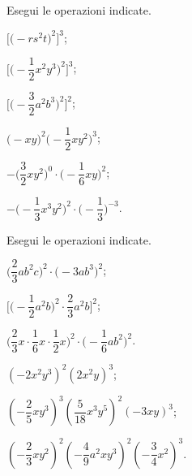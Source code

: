 \begin{esercizio}[\Ast]
 \label{ese:10.18} %
 Esegui le operazioni indicate.
\begin{multicols}{2}
\begin{enumeratea}
\spazielenx
 \item $\bigg[\big(-rs^{2}t\big)^{2}\bigg]^{3}$;
 \item $\Bigg[\bigg(-{\dfrac{1}{2}}x^{2}y^{3}\bigg)^{2}\Bigg]^{3}$;
 \item $\Bigg[\bigg(-{\dfrac{3}{2}}a^{2}b^{3}\bigg)^{2}\Bigg]^{2}$;
 \item $\big(-xy\big)^{2}\bigg(-{\dfrac{1}{2}}xy^{2}\bigg)^{3}$;
 \item $-\bigg(\dfrac{3}{2}xy^{2}\bigg)^{0}\cdot\bigg(-{\dfrac{1}{6}}xy\bigg)^{2}$;
 \item $-\bigg(-{\dfrac{1}{3}}x^{3}y^{2}\bigg)^{2}\cdot\bigg(-{\dfrac{1}{3}}\bigg)^{-3}$.
\end{enumeratea}
\end{multicols}
\end{esercizio}
\pagebreak
\begin{esercizio}[\Ast]
 \label{ese:10.19} %
 Esegui le operazioni indicate.
\begin{multicols}{2}
\begin{enumeratea}
\spazielenx
 \item $\bigg(\dfrac{2}{3}ab^{2}c\bigg)^{2}\cdot\big(-3ab^{3}\big)^{2}$;
 \item $\Bigg[\bigg(-{\dfrac{1}{2}}a^{2}b\bigg)^{2}\cdot{\dfrac{2}{3}a^{2}b}\Bigg]^{2}$;
 \item $\bigg(\dfrac{2}{3}x\cdot{\dfrac{1}{6}}x\cdot {\dfrac{1}{2}}x\bigg)^{2}\cdot\bigg(-{\dfrac{1}{6}}ab^{2}\bigg)^{2}$.
 \item $\left(-2x^2y^3\right)^2\left(2x^2y\right)^3$;
 \item $\left(-\dfrac{2}{5}xy^3\right)^3\left(\dfrac{5}{18}x^3y^5\right)^2\left(-3xy\right)^3$;
 \item $\left(-\dfrac{2}{3}xy^2\right)^2\left(-\dfrac{4}{9}a^2xy^3\right)^2\left(-\dfrac{3}{4}x^2\right)^3$.
\end{enumeratea}
\end{multicols}
\end{esercizio}


